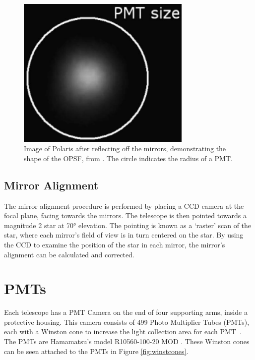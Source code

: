 \begin{figure}[ht]
  \centering
  \includegraphics[width=0.75\textwidth]{images/mirror_polaris.eps}
  \caption[Polaris PSF]{
    Image of Polaris after reflecting off the mirrors, demonstrating the shape of the OPSF, from \cite{Veritas_Detector}.
    The circle indicates the radius of a PMT.}
  \label{fig:mirrorpolaris}
\end{figure}



\subsection{Mirror Alignment}
The mirror alignment procedure is performed by placing a CCD camera at the focal plane, facing towards the mirrors.
The telescope is then pointed towards a magnitude 2 star at \nicetilde{}\ang{70} elevation.
The pointing is known as a `raster' scan of the star, where each mirror's field of view is in turn centered on the star.
By using the CCD to examine the position of the star in each mirror, the mirror's alignment can be calculated and corrected.



\section{PMTs}\label{sec:pmts}

Each telescope has a PMT Camera on the end of four supporting arms, inside a protective housing.
This camera consists of 499 Photo Multiplier Tubes (PMTs), each with a Winston cone to increase the light collection area for each PMT~\cite{Winston1970}.
The PMTs are Hamamatsu's model R10560-100-20 MOD \cite{pmtmodels}.
These Winston cones can be seen attached to the PMTs in Figure \ref{fig:winstcones}.

